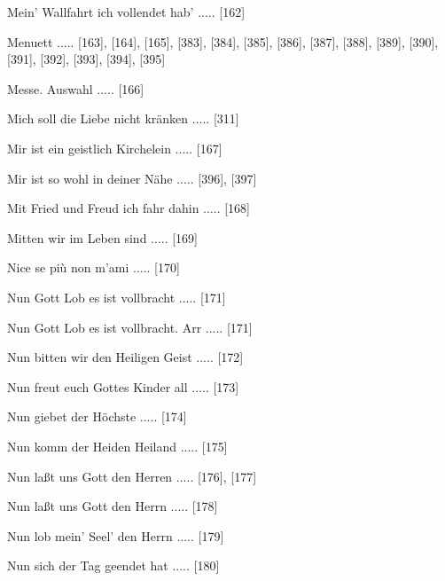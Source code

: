 \documentclass[twocolumn, 12pt]{book}
\begin{document}
\newline 
Mein' Wallfahrt ich vollendet hab' ..... [162]

\newline 
Menuett ..... [163], [164], [165], [383], [384], [385], [386], [387], [388], [389], [390], [391], [392], [393], [394], [395]

\newline 
Messe. Auswahl ..... [166]

\newline 
Mich soll die Liebe nicht kränken ..... [311]

\newline 
Mir ist ein geistlich Kirchelein ..... [167]

\newline 
Mir ist so wohl in deiner Nähe ..... [396], [397]

\newline 
Mit Fried und Freud ich fahr dahin ..... [168]

\newline 
Mitten wir im Leben sind ..... [169]

\newline 
Nice se più non m'ami ..... [170]

\newline 
Nun Gott Lob es ist vollbracht ..... [171]

\newline 
Nun Gott Lob es ist vollbracht. Arr ..... [171]

\newline 
Nun bitten wir den Heiligen Geist ..... [172]

\newline 
Nun freut euch Gottes Kinder all ..... [173]

\newline 
Nun giebet der Höchste ..... [174]

\newline 
Nun komm der Heiden Heiland ..... [175]

\newline 
Nun laßt uns Gott den Herren ..... [176], [177]

\newline 
Nun laßt uns Gott den Herrn ..... [178]

\newline 
Nun lob mein' Seel' den Herrn ..... [179]

\newline 
Nun sich der Tag geendet hat ..... [180]
\end{document}
